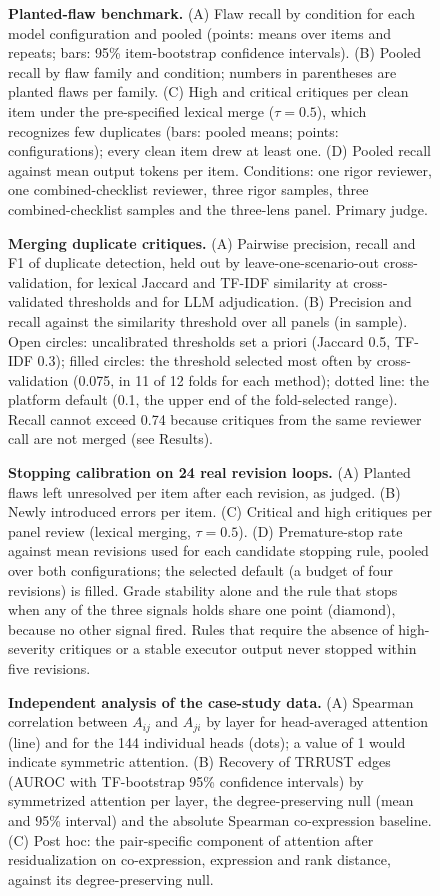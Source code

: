 \begin{figure}[!h]
\caption{{\bf Planted-flaw benchmark.}
(A) Flaw recall by condition for each model configuration and pooled (points: means over items and repeats; bars: 95\% item-bootstrap confidence intervals). (B) Pooled recall by flaw family and condition; numbers in parentheses are planted flaws per family. (C) High and critical critiques per clean item under the pre-specified lexical merge ($\tau=0.5$), which recognizes few duplicates (bars: pooled means; points: configurations); every clean item drew at least one. (D) Pooled recall against mean output tokens per item. Conditions: one rigor reviewer, one combined-checklist reviewer, three rigor samples, three combined-checklist samples and the three-lens panel. Primary judge.}
\label{fig2}
\end{figure}
\begin{figure}[!h]
\caption{{\bf Merging duplicate critiques.}
(A) Pairwise precision, recall and F1 of duplicate detection, held out by leave-one-scenario-out cross-validation, for lexical Jaccard and TF-IDF similarity at cross-validated thresholds and for LLM adjudication. (B) Precision and recall against the similarity threshold over all panels (in sample). Open circles: uncalibrated thresholds set a priori (Jaccard 0.5, TF-IDF 0.3); filled circles: the threshold selected most often by cross-validation (0.075, in 11 of 12 folds for each method); dotted line: the platform default (0.1, the upper end of the fold-selected range). Recall cannot exceed 0.74 because critiques from the same reviewer call are not merged (see Results).}
\label{fig3}
\end{figure}
\begin{figure}[!h]
\caption{{\bf Stopping calibration on 24 real revision loops.}
(A) Planted flaws left unresolved per item after each revision, as judged. (B) Newly introduced errors per item. (C) Critical and high critiques per panel review (lexical merging, $\tau=0.5$). (D) Premature-stop rate against mean revisions used for each candidate stopping rule, pooled over both configurations; the selected default (a budget of four revisions) is filled. Grade stability alone and the rule that stops when any of the three signals holds share one point (diamond), because no other signal fired. Rules that require the absence of high-severity critiques or a stable executor output never stopped within five revisions.}
\label{fig4}
\end{figure}
\begin{figure}[!h]
\caption{{\bf Independent analysis of the case-study data.}
(A) Spearman correlation between $A_{ij}$ and $A_{ji}$ by layer for head-averaged attention (line) and for the 144 individual heads (dots); a value of 1 would indicate symmetric attention. (B) Recovery of TRRUST edges (AUROC with TF-bootstrap 95\% confidence intervals) by symmetrized attention per layer, the degree-preserving null (mean and 95\% interval) and the absolute Spearman co-expression baseline. (C) Post hoc: the pair-specific component of attention after residualization on co-expression, expression and rank distance, against its degree-preserving null.}
\label{fig5}
\end{figure}
